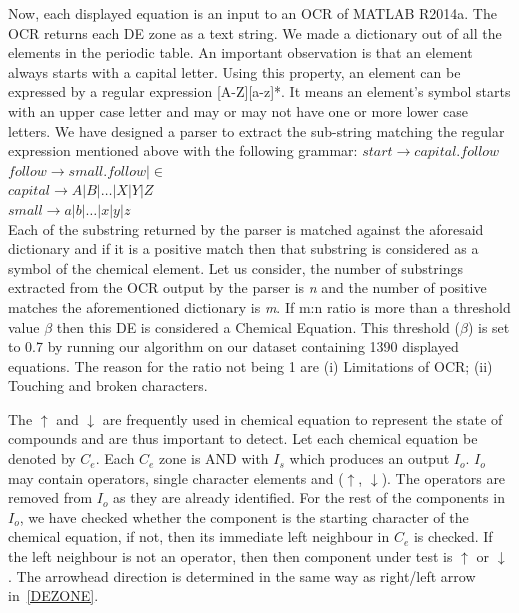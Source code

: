 Now, each displayed equation is an input to an OCR of MATLAB
R2014a. The OCR returns each DE zone as a text string. We made a
dictionary out of all the elements in the periodic table. An
important observation is that an element always starts with a
capital letter. Using this property, an element can be expressed
by a regular expression [A-Z][a-z]*. It means an element's
symbol starts with an upper case letter and may or may not have
one or more lower case letters. We have designed a parser to extract the
sub-string matching the regular expression mentioned above with
the following grammar: %
\small{
 $start \rightarrow capital.follow$\\ $follow \rightarrow small.follow | \in$\\
$capital \rightarrow A|B| \dots |X|Y|Z$\\  $small \rightarrow
a|b| \dots |x|y|z$\\ }
Each of the substring returned
by the parser is matched against the aforesaid dictionary and if
it is a positive match then that substring is considered as a
symbol of the chemical element. Let us consider, the number of
substrings extracted from the OCR output by the parser is {\em
n} and the number of positive matches the aforementioned
dictionary is {\em m}. If m:n ratio is more than a threshold
value $\beta$ then this DE is considered a Chemical Equation.
This threshold ($\beta$) is set to 0.7 by running our algorithm
on our dataset containing 1390 displayed equations. The reason
for the ratio not being 1 are (i) Limitations of OCR; (ii)
Touching and broken characters.

The $\uparrow$ and $\downarrow$ are frequently used in chemical equation to represent the state of compounds and  are thus important to detect.
Let each chemical equation be denoted by $C_e$. Each $C_e$ zone is AND with $I_s$ which produces an output $I_o$. $I_o$ may contain  operators, single character elements and ($\uparrow$, $\downarrow$). The operators are removed from $I_o$ as they are already identified. For the rest of the components in $I_o$, we have checked whether the component is the starting character of the chemical equation, if not, then its immediate left neighbour in $C_e$ is checked. If the left neighbour is not an operator, then then component under test is  $\uparrow$ or $\downarrow$. The arrowhead direction is determined in the same way as right/left arrow in~\ref{DEZONE}.
